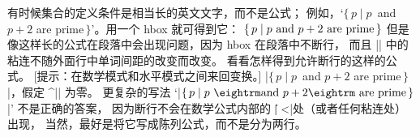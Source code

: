\dangerexercise 有时候集合的定义条件是相当长的英文文字，而不是公式；
例如，`$\{\,p\mid p$~and $p+2$ are prime$\,\}$'。用一个 hbox 就可得到它：
\begintt
$\{\,p\mid\hbox{$p$ and $p+2$ are prime}\,\}$
\endtt
但是像这样长的公式在段落中会出现问题，因为 hbox 在段落中不断行，
而且 |\hbox| 中的粘连不随外面行中单词间距的改变而改变。
看看怎样得到允许断行的这样的公式。%
[{提示}：在数学模式和水平模式之间来回变换。]
\answer \1|$\{\,p\mid p$~and $p+2$ are prime$\,\}$|，假定 ^|\mathsurround| 为零。
更复杂的写法
`|$\{\,p\mid p\ {\rm and}\ p+2\rm\ are\ prime\,\}$|' 不是正确的答案，
因为断行不会在数学公式内部的 |\|\] ^^|\space|处（或者任何粘连处）出现，
当然，最好是将它写成陈列公式，而不是分为两行。

